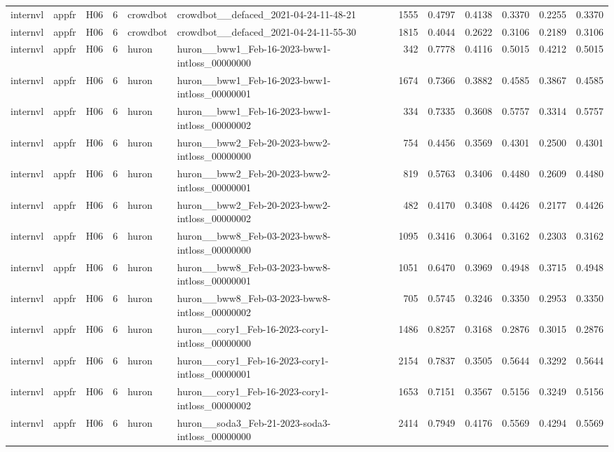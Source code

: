\begin{table}[tbp]
\begin{tabular}{lllrllrrrrrr}
internvl & appfr & H06 & 6 & crowdbot & crowdbot\_\_defaced\_2021-04-24-11-48-21 & 1555 & 0.4797 & 0.4138 & 0.3370 & 0.2255 & 0.3370 \\
internvl & appfr & H06 & 6 & crowdbot & crowdbot\_\_defaced\_2021-04-24-11-55-30 & 1815 & 0.4044 & 0.2622 & 0.3106 & 0.2189 & 0.3106 \\
internvl & appfr & H06 & 6 & huron & huron\_\_bww1\_Feb-16-2023-bww1-intloss\_00000000 & 342 & 0.7778 & 0.4116 & 0.5015 & 0.4212 & 0.5015 \\
internvl & appfr & H06 & 6 & huron & huron\_\_bww1\_Feb-16-2023-bww1-intloss\_00000001 & 1674 & 0.7366 & 0.3882 & 0.4585 & 0.3867 & 0.4585 \\
internvl & appfr & H06 & 6 & huron & huron\_\_bww1\_Feb-16-2023-bww1-intloss\_00000002 & 334 & 0.7335 & 0.3608 & 0.5757 & 0.3314 & 0.5757 \\
internvl & appfr & H06 & 6 & huron & huron\_\_bww2\_Feb-20-2023-bww2-intloss\_00000000 & 754 & 0.4456 & 0.3569 & 0.4301 & 0.2500 & 0.4301 \\
internvl & appfr & H06 & 6 & huron & huron\_\_bww2\_Feb-20-2023-bww2-intloss\_00000001 & 819 & 0.5763 & 0.3406 & 0.4480 & 0.2609 & 0.4480 \\
internvl & appfr & H06 & 6 & huron & huron\_\_bww2\_Feb-20-2023-bww2-intloss\_00000002 & 482 & 0.4170 & 0.3408 & 0.4426 & 0.2177 & 0.4426 \\
internvl & appfr & H06 & 6 & huron & huron\_\_bww8\_Feb-03-2023-bww8-intloss\_00000000 & 1095 & 0.3416 & 0.3064 & 0.3162 & 0.2303 & 0.3162 \\
internvl & appfr & H06 & 6 & huron & huron\_\_bww8\_Feb-03-2023-bww8-intloss\_00000001 & 1051 & 0.6470 & 0.3969 & 0.4948 & 0.3715 & 0.4948 \\
internvl & appfr & H06 & 6 & huron & huron\_\_bww8\_Feb-03-2023-bww8-intloss\_00000002 & 705 & 0.5745 & 0.3246 & 0.3350 & 0.2953 & 0.3350 \\
internvl & appfr & H06 & 6 & huron & huron\_\_cory1\_Feb-16-2023-cory1-intloss\_00000000 & 1486 & 0.8257 & 0.3168 & 0.2876 & 0.3015 & 0.2876 \\
internvl & appfr & H06 & 6 & huron & huron\_\_cory1\_Feb-16-2023-cory1-intloss\_00000001 & 2154 & 0.7837 & 0.3505 & 0.5644 & 0.3292 & 0.5644 \\
internvl & appfr & H06 & 6 & huron & huron\_\_cory1\_Feb-16-2023-cory1-intloss\_00000002 & 1653 & 0.7151 & 0.3567 & 0.5156 & 0.3249 & 0.5156 \\
internvl & appfr & H06 & 6 & huron & huron\_\_soda3\_Feb-21-2023-soda3-intloss\_00000000 & 2414 & 0.7949 & 0.4176 & 0.5569 & 0.4294 & 0.5569 \\

\end{tabular}
\end{table}
